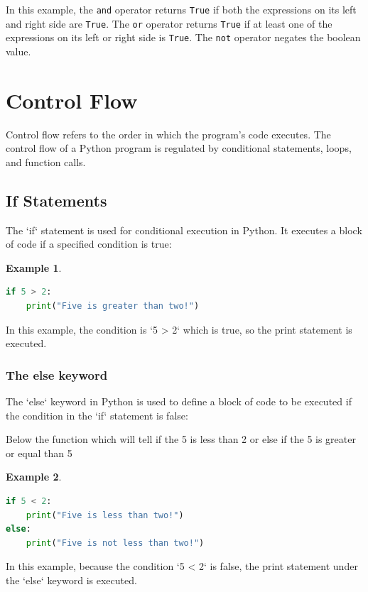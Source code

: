 \documentclass[12pt]{article}
\newtheorem{Example}{Example}[section]
\begin{document}
In this example, the \texttt{and} operator returns \texttt{True} if both the expressions on its left and right side are \texttt{True}. The \texttt{or} operator returns \texttt{True} if at least one of the expressions on its left or right side is \texttt{True}. The \texttt{not} operator negates the boolean value.

\newpage
\section{Control Flow}
Control flow refers to the order in which the program's code executes. The control flow of a Python program is regulated by conditional statements, loops, and function calls.

\subsection{If Statements}

The `if` statement is used for conditional execution in Python. It executes a block of code if a specified condition is true:
\begin{Example}
\begin{lstlisting}[language=Python]
if 5 > 2:
    print("Five is greater than two!")
\end{lstlisting}
\end{Example}
In this example, the condition is `5 > 2` which is true, so the print statement is executed.


\subsubsection{The else keyword}
The `else` keyword in Python is used to define a block of code to be executed if the condition in the `if` statement is false:

Below the function which will tell if the 5 is less than 2 or else if the 5 is greater or equal than 5
\begin{Example}
\begin{lstlisting}[language=Python]
if 5 < 2:
    print("Five is less than two!")
else:
    print("Five is not less than two!")
\end{lstlisting}
\end{Example}
In this example, because the condition `5 < 2` is false, the print statement under the `else` keyword is executed.
\end{document}
